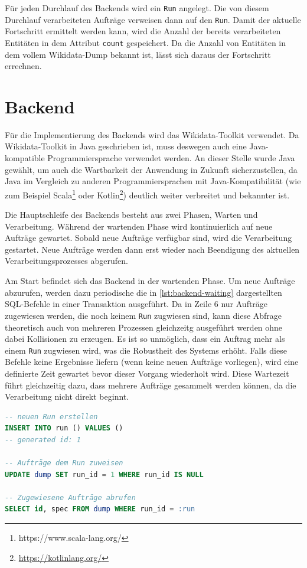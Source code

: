 Für jeden Durchlauf des Backends wird ein \verb|Run| angelegt.
Die von diesem Durchlauf verarbeiteten Aufträge verweisen dann auf den \verb|Run|.
Damit der aktuelle Fortschritt ermittelt werden kann, wird die Anzahl der bereits verarbeiteten Entitäten in dem Attribut \verb|count| gespeichert.
Da die Anzahl von Entitäten in dem vollem Wikidata-Dump bekannt ist, lässt sich daraus der Fortschritt errechnen.

\section{Backend}
Für die Implementierung des Backends wird das Wikidata-Toolkit verwendet.
Da Wikidata-Toolkit in Java geschrieben ist, muss deswegen auch eine Java-kompatible Programmiersprache verwendet werden.
An dieser Stelle wurde Java gewählt, um auch die Wartbarkeit der Anwendung in Zukunft sicherzustellen, da Java im Vergleich zu anderen Programmiersprachen mit Java-Kompatibilität (wie zum Beispiel Scala\footnote{https://www.scala-lang.org/} oder Kotlin\footnote{\url{https://kotlinlang.org/}}) deutlich weiter verbreitet und bekannter ist.

Die Hauptschleife des Backends besteht aus zwei Phasen, Warten und Verarbeitung.
Während der wartenden Phase wird kontinuierlich auf neue Aufträge gewartet.
Sobald neue Aufträge verfügbar sind, wird die Verarbeitung gestartet. 
Neue Aufträge werden dann erst wieder nach Beendigung des aktuellen Verarbeitungsprozesses abgerufen.

Am Start befindet sich das Backend in der wartenden Phase.
Um neue Aufträge abzurufen, werden dazu periodische die in \cref{lst:backend-waiting} dargestellten SQL-Befehle in einer Transaktion ausgeführt.
Da in Zeile 6 nur Aufträge zugewiesen werden, die noch keinem \verb|Run| zugwiesen sind, kann diese Abfrage theoretisch auch von mehreren Prozessen gleichzeitg ausgeführt werden ohne dabei Kollisionen zu erzeugen.
Es ist so unmöglich, dass ein Auftrag mehr als einem \verb|Run| zugwiesen wird, was die Robustheit des Systems erhöht.
Falls diese Befehle keine Ergebnisse liefern (wenn keine neuen Aufträge vorliegen), wird eine definierte Zeit gewartet bevor dieser Vorgang wiederholt wird.
Diese Wartezeit führt gleichzeitig dazu, dass mehrere Aufträge gesammelt werden können, da die Verarbeitung nicht direkt beginnt.

\begin{lstlisting}[language=SQL, caption={Abrufen neuer Aufträge}, label={lst:backend-waiting}]
-- neuen Run erstellen
INSERT INTO run () VALUES ()
-- generated id: 1

-- Aufträge dem Run zuweisen
UPDATE dump SET run_id = 1 WHERE run_id IS NULL

-- Zugewiesene Aufträge abrufen
SELECT id, spec FROM dump WHERE run_id = :run
\end{lstlisting}

